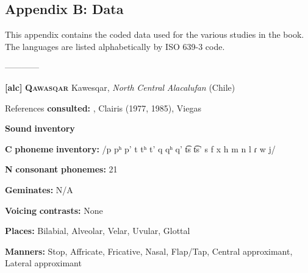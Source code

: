 

\subsection{Appendix B: Data}
\begin{styleBody}
This appendix contains the coded data used for the various studies in the book. The languages are listed alphabetically by ISO 639-3 code.
\end{styleBody}

\begin{styleBody}
————
\end{styleBody}

\begin{styleBody}
\textbf{[alc]}   \textbf{\textsc{Qawasqar}}  Kawesqar, \textit{North} \textit{Central} \textit{Alacalufan} (Chile)
\end{styleBody}

\begin{styleBody}
References \textbf{consulted:} \citet{Aguilera2001}, Clairis (1977, 1985), Viegas \citet{Barros1990}
\end{styleBody}

\begin{styleBody}
\textbf{Sound} \textbf{inventory}
\end{styleBody}

\begin{styleBody}
\textbf{C} \textbf{phoneme} \textbf{inventory:} /p pʰ p’ t tʰ t’ q qʰ q’ t͡s t͡s’ s f x h m n l ɾ w j/
\end{styleBody}

\begin{styleBody}
\textbf{N} \textbf{consonant} \textbf{phonemes:} 21
\end{styleBody}

\begin{styleBody}
\textbf{Geminates:} N/A
\end{styleBody}

\begin{styleBody}
\textbf{Voicing} \textbf{contrasts:} None
\end{styleBody}

\begin{styleBody}
\textbf{Places:} Bilabial, Alveolar, Velar, Uvular, Glottal
\end{styleBody}

\begin{styleBody}
\textbf{Manners:} Stop, Affricate, Fricative, Nasal, Flap/Tap, Central approximant, Lateral approximant
\end{styleBody}

